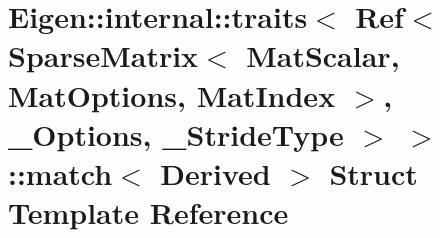 \hypertarget{struct_eigen_1_1internal_1_1traits_3_01_ref_3_01_sparse_matrix_3_01_mat_scalar_00_01_mat_optionsc6ef0ce4e339306d76a1e27f17721ded}{}\section{Eigen\+:\+:internal\+:\+:traits$<$ Ref$<$ Sparse\+Matrix$<$ Mat\+Scalar, Mat\+Options, Mat\+Index $>$, \+\_\+\+Options, \+\_\+\+Stride\+Type $>$ $>$\+:\+:match$<$ Derived $>$ Struct Template Reference}
\label{struct_eigen_1_1internal_1_1traits_3_01_ref_3_01_sparse_matrix_3_01_mat_scalar_00_01_mat_optionsc6ef0ce4e339306d76a1e27f17721ded}
